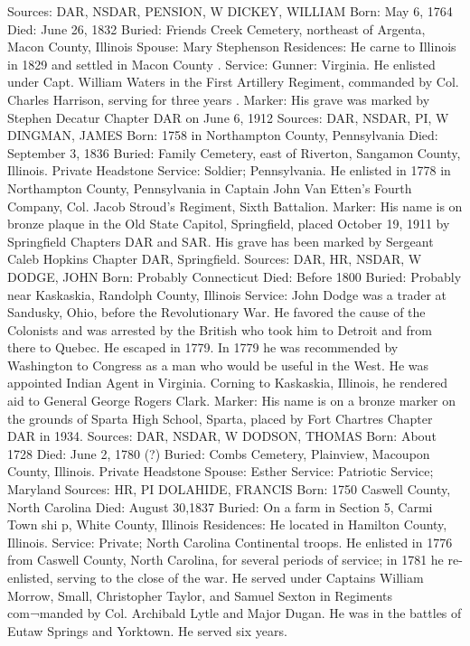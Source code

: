 Sources: DAR, NSDAR, PENSION, W
DICKEY, WILLIAM 
Born: May 6, 1764 
Died: June 26, 1832 
Buried: Friends Creek Cemetery, northeast of Argenta, Macon County, Illinois 
Spouse: Mary Stephenson 
Residences: He carne to Illinois in 1829 and settled in Macon County . 
Service: Gunner: Virginia. He enlisted under Capt. William Waters in the First 
Artillery Regiment, commanded by Col. Charles Harrison, serving for three years . Marker: His grave was marked by Stephen Decatur Chapter DAR on June 6, 1912 
Sources: DAR, NSDAR, PI, W 
DINGMAN, JAMES 
Born: 1758 in Northampton County, Pennsylvania Died: September 3, 1836 Buried: Family Cemetery, east of Riverton, Sangamon County, Illinois. Private Headstone 
Service: Soldier;  Pennsylvania. He enlisted in 1778 in Northampton County, Pennsylvania in Captain John Van Etten's Fourth Company, Col. Jacob Stroud's Regiment, Sixth Battalion. 
Marker: His name is on bronze plaque in the Old State Capitol, Springfield, placed October 19, 1911 by Springfield Chapters DAR and SAR. His grave has been marked by Sergeant Caleb Hopkins Chapter DAR, Springfield. 
Sources: DAR, HR, NSDAR, W 
DODGE, JOHN 
Born: Probably Connecticut 
Died: Before 1800 Buried: Probably near Kaskaskia, Randolph County, Illinois 
Service: John Dodge was a trader at Sandusky, Ohio, before the Revolutionary War. He favored the cause of the Colonists and was arrested by the British who took him to Detroit and from there to Quebec. He escaped in 1779. In 1779 he was recommended by Washington to Congress as a man who would be useful in the West. He was appointed Indian Agent in Virginia. Corning to Kaskaskia, Illinois, he rendered aid to General George Rogers Clark. 
Marker: His name is on a bronze marker on the grounds of Sparta High School, Sparta, placed by Fort Chartres Chapter DAR in 1934. 
Sources: DAR, NSDAR, W 
DODSON, THOMAS 
Born: About 1728 
Died: June 2, 1780 (?) 
Buried: Combs Cemetery, Plainview, Macoupon County, Illinois. Private Head­stone 
Spouse: Esther 
Service: Patriotic Service; Maryland 
Sources: HR, PI 
DOLAHIDE, FRANCIS 
Born: 1750 Caswell County, North Carolina 
Died: August 30,1837 
Buried: On a farm in Section 5, Carmi Town shi p, White County, Illinois 
Residences: He located in Hamilton County, Illinois. 
Service: Private; North Carolina Continental troops. He enlisted in 1776 from Caswell County, North Carolina, for several periods of service; in 1781 he re-enlisted, serving to the close of the war. He served under Captains William Morrow, Small, Christopher Taylor, and Samuel Sexton in Regiments com¬manded by Col. Archibald Lytle and Major Dugan. He was in the battles of Eutaw Springs and Yorktown. He served six years. 
